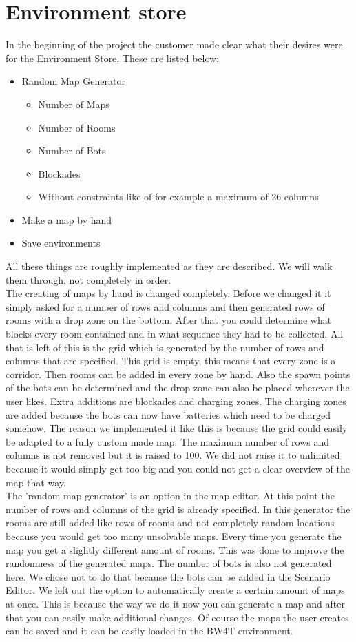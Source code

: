 \section{Environment store}
In the beginning of the project the customer made clear what their desires were for the Environment Store. These are listed below:
\begin{itemize}
	\item Random Map Generator
	\begin{itemize}
		\item Number of Maps
		\item Number of Rooms
		\item Number of Bots
		\item Blockades
		\item Without constraints like of for example a maximum of 26 columns
	\end{itemize}
	\item Make a map by hand
	\item Save environments
\end{itemize} 

All these things are roughly implemented as they are described. 
We will walk them through, not completely in order. \\
\indent The creating of maps by hand is changed completely. Before we changed it it simply asked for a number of rows and columns and then generated rows of rooms with a drop zone on the bottom. After that you could determine what blocks every room contained and in what sequence they had to be collected. All that is left of this is the grid which is generated by the number of rows and columns that are specified. This grid is empty, this means that every zone is a corridor. Then rooms can be added in every zone by hand. Also the spawn points of the bots can be determined and the drop zone can also be placed wherever the user likes. Extra additions are blockades and charging zones. The charging zones are added because the bots can now have batteries which need to be charged somehow. The reason we implemented it like this is because the grid could easily be adapted to a fully custom made map. The maximum number of rows and columns is not removed but it is raised to 100. We did not raise it to unlimited because it would simply get too big and you could not get a clear overview of the map that way.\\
\indent The 'random map generator' is an option in the map editor. At this point the number of rows and columns of the grid is already specified. In this generator the rooms are still added like rows of rooms and not completely random locations because you would get too many unsolvable maps. Every time you generate the map you get a slightly different amount of rooms. This was done to improve the randomness of the generated maps. The number of bots is also not generated here. We chose not to do that because the bots can be added in the Scenario Editor. We left out the option to automatically create a certain amount of maps at once. This is because the way we do it now you can generate a map and after that you can easily make additional changes. Of course the maps the user creates can be saved and it can be easily loaded in the BW4T environment.